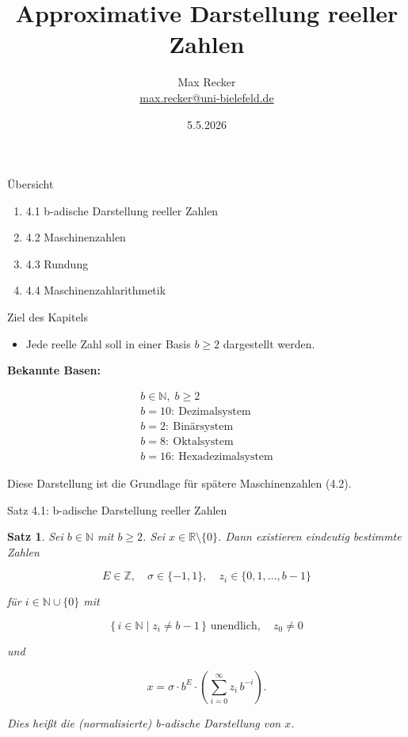 \documentclass{beamer}
\title{Approximative Darstellung reeller Zahlen}
\date{5.5.2026}
\author{Max Recker\\ \url{max.recker@uni-bielefeld.de}}
\newcommand{\Z}{\mathbb{Z}}
\newcommand{\R}{\mathbb{R}}
\newcommand{\N}{\mathbb{N}}
\newtheorem{thm}{Satz}
\begin{document}
\begin{frame}
\titlepage
\end{frame}

\begin{frame}{Übersicht}
\begin{enumerate}
\item 4.1 b-adische Darstellung reeller Zahlen
\item 4.2 Maschinenzahlen
\item 4.3 Rundung
\item 4.4 Maschinenzahlarithmetik
\end{enumerate}
\end{frame}

\begin{frame}{Ziel des Kapitels}

\begin{itemize}
    \item Jede reelle Zahl soll in einer Basis \( b \geq 2 \) dargestellt werden.
\end{itemize}

\vspace{0.5cm}

\textbf{Bekannte Basen:}

\[
\begin{array}{l}
b \in \N,\; b \geq 2 \\[0.3em]
b = 10:\ \text{Dezimalsystem} \\
b = 2:\ \text{Binärsystem} \\
b = 8:\ \text{Oktalsystem} \\
b = 16:\ \text{Hexadezimalsystem}
\end{array}
\]

\vspace{0.5cm}

Diese Darstellung ist die Grundlage für spätere Maschinenzahlen (4.2).

\end{frame}

\begin{frame}{Satz 4.1: b-adische Darstellung reeller Zahlen}

\begin{thm}
Sei \( b \in \N \) mit \( b \geq 2 \). Sei \( x \in \R \setminus \{0\} \). Dann existieren eindeutig bestimmte Zahlen

\[
E \in \Z,\quad \sigma \in \{-1,1\},\quad z_i \in \{0,1,\dots,b-1\}
\]

für \( i \in \N \cup \{0\} \) mit

\[
\{\, i \in \N \mid z_i \neq b-1 \,\} \text{ unendlich}, \quad z_0 \neq 0
\]

und

\[
x=\sigma \cdot b^E \cdot \left(\sum_{i=0}^{\infty} z_i \, b^{-i}\right).
\]

Dies heißt die (normalisierte) b-adische Darstellung von \(x\).
\end{thm}

\end{frame}
\end{document}
